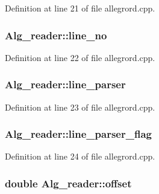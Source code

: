 Definition at line 21 of file allegrord.\+cpp.

\subsubsection[{\texorpdfstring{line\+\_\+no}{line_no}}]{ Alg\+\_\+reader\+::line\+\_\+no}\hypertarget{class_alg__reader_a132fd0277b14ae8820cf098cbe656322}{}\label{class_alg__reader_a132fd0277b14ae8820cf098cbe656322}


Definition at line 22 of file allegrord.\+cpp.

\subsubsection[{\texorpdfstring{line\+\_\+parser}{line_parser}}]{ Alg\+\_\+reader\+::line\+\_\+parser}\hypertarget{class_alg__reader_aa47101fcf6bacfcb6da3a9c2b54fe63f}{}\label{class_alg__reader_aa47101fcf6bacfcb6da3a9c2b54fe63f}


Definition at line 23 of file allegrord.\+cpp.

\subsubsection[{\texorpdfstring{line\+\_\+parser\+\_\+flag}{line_parser_flag}}]{ Alg\+\_\+reader\+::line\+\_\+parser\+\_\+flag}\hypertarget{class_alg__reader_a8b518c761b47bbc7ccfb2acff9607880}{}\label{class_alg__reader_a8b518c761b47bbc7ccfb2acff9607880}


Definition at line 24 of file allegrord.\+cpp.

\subsubsection[{\texorpdfstring{offset}{offset}}]{\setlength{\rightskip}{0pt plus 5cm}double Alg\+\_\+reader\+::offset}\hypertarget{class_alg__reader_aa54370e6326e9162b4bf15ed771dadc0}{}\label{class_alg__reader_aa54370e6326e9162b4bf15ed771dadc0}


